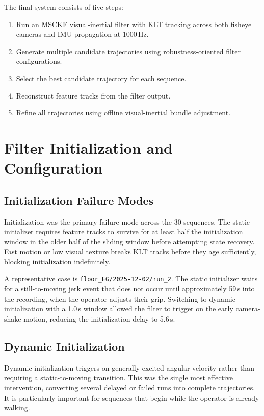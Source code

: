 \documentclass[journal]{IEEEtran}
\begin{document}
The final system consists of five steps:
\begin{enumerate}
    \item Run an MSCKF visual-inertial filter with KLT tracking across both
          fisheye cameras and IMU propagation at 1000\,Hz.
    \item Generate multiple candidate trajectories using robustness-oriented
          filter configurations.
    \item Select the best candidate trajectory for each sequence.
    \item Reconstruct feature tracks from the filter output.
    \item Refine all trajectories using offline visual-inertial bundle adjustment.
\end{enumerate}



\section{Filter Initialization and Configuration}

\subsection{Initialization Failure Modes}

Initialization was the primary failure mode across the 30 sequences.
The static initializer requires feature tracks to survive for at least half
the initialization window in the older half of the sliding window before
attempting state recovery.
Fast motion or low visual texture breaks KLT tracks before they age
sufficiently, blocking initialization indefinitely.

A representative case is \texttt{floor\_EG/2025-12-02/run\_2}.
The static initializer waits for a still-to-moving jerk event that does not
occur until approximately 59\,s into the recording, when the operator
adjusts their grip.
Switching to dynamic initialization with a 1.0\,s window allowed the filter
to trigger on the early camera-shake motion, reducing the initialization
delay to 5.6\,s.

\subsection{Dynamic Initialization}

Dynamic initialization triggers on generally excited angular velocity rather
than requiring a static-to-moving transition.
This was the single most effective intervention, converting several delayed
or failed runs into complete trajectories.
It is particularly important for sequences that begin while the operator is
already walking.
\end{document}
